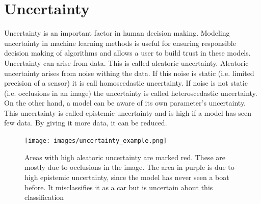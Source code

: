 \documentclass[a4paper,cleardoubleempty,BCOR1cm, 11pt]{report}
\begin{document}
\section{Uncertainty}
Uncertainty is an important factor in human decision making. Modeling uncertainty in machine learning methods is useful for ensuring responsible decision making of algorithms and allows a user to build trust in these models. Uncertainty can arise from data. This is called aleatoric uncertainty. Aleatoric uncertainty arises from noise withing the data. If this noise is static (i.e. limited precision of a sensor) it is call homoscedastic uncertainty. If noise is not static (i.e. occlusions in an image) the uncertainty is called heteroscedastic uncertainty.\\
On the other hand, a model can be aware of its own parameter's uncertainty. This uncertainty is called epistemic uncertainty and is high if a model has seen few data. By giving it more data, it can be reduced.
\begin{figure}
	\centering
	\texttt{[image: images/uncertainty\_example.png]} 
	\caption{Areas with high aleatoric uncertainty are marked red. These are mostly due to occlusions in the image. The area in purple is due to high epistemic uncertainty, since the model has never seen a boat before. It misclassifies it as a car but is uncertain about this classification}
	\label{fig:uncertainty_example}
\end{figure}
\end{document}
